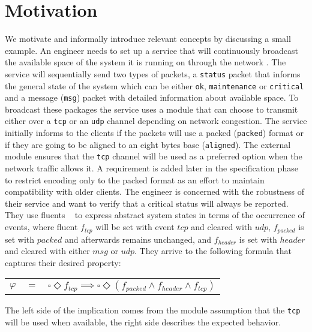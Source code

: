 \section{Motivation}\label{sec:motivation}
We motivate and informally introduce relevant concepts by discussing a small example.
An engineer needs to set up a service that will continuously broadcast the available space of the system it is running on through the network . The service will sequentially send two types of packets, a \texttt{status} packet that informs the general state of the system which can be either \texttt{ok}, \texttt{maintenance} or \texttt{critical} and a message (\texttt{msg}) packet with detailed information about available space. To broadcast these packages the service uses a module that can choose to transmit either over a \texttt{tcp} or an \texttt{udp} channel depending on network congestion. The service initially informs to the clients if the packets will use a packed (\texttt{packed}) format or if they are going to be aligned to an eight bytes base (\texttt{aligned}).  
The external module ensures that the \texttt{tcp} channel will be used as a preferred option when the network traffic allows it. A requirement is added later in the specification phase to restrict encoding only to the packed format as an effort to maintain compatibility with older clients. The engineer is concerned with the robustness of their service and want to verify that a critical status will always be reported. They use fluents ~\cite{DBLP:conf/sigsoft/GiannakopoulouM03} to express abstract system states in terms of the occurrence of events, where fluent $f_{tcp}$ will be set with event $tcp$ and cleared with $udp$, $f_{packed}$ is set with $packed$ and afterwards remains unchanged, and $f_{header}$ is set with $header$ and cleared with either $msg$ or $udp$. They arrive to the following formula that captures their desired property:

\begin{center}
	\begin{tabular}{ r c l }
		$\varphi$& $=$ &$\square \Diamond f_{tcp}\implies\square \Diamond (f_{packed} \wedge f_{header} \wedge f_{tcp})$\\
	\end{tabular}
\end{center} 
The left side of the implication comes from the module assumption that the \texttt{tcp} will be used when available, the right side describes the expected behavior.

